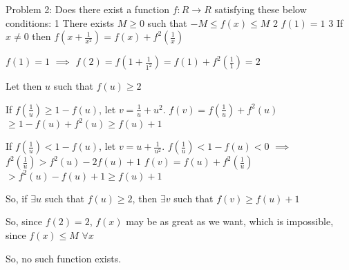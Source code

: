 \begin{solution}
	\begin{tcolorbox}Problem 2:
Does there exist a function $ f: R \rightarrow R$ satisfying these below conditions:
1\/ There exists $ M \ge 0$ such that $ - M \le f(x) \le M$
2\/ $ f(1) = 1$
3\/ If $ x \neq 0$ then $ f(x + \frac {1}{x^2}) = f(x) + f^2(\frac {1}{x})$\end{tcolorbox}

$ f(1) = 1$ $ \implies$ $ f(2) = f(1 + \frac {1}{1^2}) = f(1) + f^2(\frac {1}{1}) = 2$

Let then $ u$ such that $ f(u)\geq 2$

If $ f(\frac {1}{u})\geq 1 - f(u)$, let $ v = \frac {1}{u} + u^2$.
$ f(v) = f(\frac {1}{u}) + f^2(u)$ $ \geq 1 - f(u) + f^2(u)\geq f(u) + 1$

If $ f(\frac {1}{u}) < 1 - f(u)$, let $ v = u + \frac {1}{u^2}$.
$ f(\frac {1}{u}) < 1 - f(u) < 0$ $ \implies$ $ f^2(\frac {1}{u}) > f^2(u) - 2f(u) + 1$
$ f(v) = f(u) + f^2(\frac {1}{u})$ $ > f^2(u) - f(u) + 1\geq f(u) + 1$

So, if $ \exists u$ such that $ f(u)\geq 2$, then $ \exists v$ such that $ f(v)\geq f(u) + 1$

So, since $ f(2) = 2$, $ f(x)$ may be as great as we want, which is impossible, since $ f(x)\leq M$ $ \forall x$

So, no such function exists.
\end{solution}



